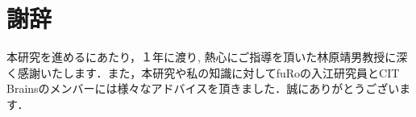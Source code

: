 \chapter*{謝辞}

本研究を進めるにあたり，１年に渡り, 熱心にご指導を頂いた林原靖男教授に深く感謝いたします．また，本研究や私の知識に対してfuRoの入江研究員とCIT Brainsのメンバーには様々なアドバイスを頂きました．誠にありがとうございます．